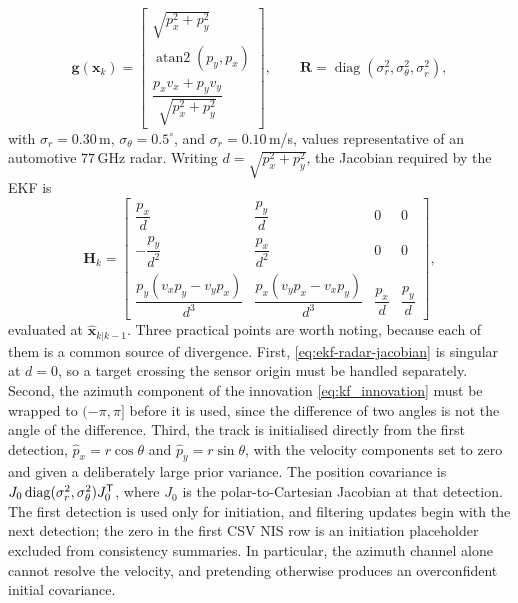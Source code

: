 \begin{example}
\begin{equation}
\mathbf{g}(\mathbf{x}_k)=
\begin{bmatrix}
\sqrt{p_x^{2}+p_y^{2}}\\[4pt]
\operatorname{atan2}(p_y,p_x)\\[4pt]
\dfrac{p_xv_x+p_yv_y}{\sqrt{p_x^{2}+p_y^{2}}}
\end{bmatrix},
\qquad
\mathbf{R}=\operatorname{diag}\!\left(\sigma_r^{2},\sigma_\theta^{2},\sigma_{\dot r}^{2}\right),
\label{eq:ekf-radar-meas}
\end{equation}
with $\sigma_r=0.30$\,m, $\sigma_\theta=0.5^{\circ}$, and
$\sigma_{\dot r}=0.10$\,m/s, values representative of an automotive
$77$\,GHz radar. Writing $d=\sqrt{p_x^{2}+p_y^{2}}$, the Jacobian required by
the EKF is
\begin{equation}
\mathbf{H}_k=
\begin{bmatrix}
\dfrac{p_x}{d} & \dfrac{p_y}{d} & 0 & 0\\[8pt]
-\dfrac{p_y}{d^{2}} & \dfrac{p_x}{d^{2}} & 0 & 0\\[8pt]
\dfrac{p_y(v_xp_y-v_yp_x)}{d^{3}} &
\dfrac{p_x(v_yp_x-v_xp_y)}{d^{3}} &
\dfrac{p_x}{d} & \dfrac{p_y}{d}
\end{bmatrix},
\label{eq:ekf-radar-jacobian}
\end{equation}
evaluated at $\widehat{\mathbf{x}}_{k|k-1}$. Three practical points are worth
noting, because each of them is a common source of divergence. First,
\eqref{eq:ekf-radar-jacobian} is singular at $d=0$, so a target crossing the
sensor origin must be handled separately. Second, the azimuth component of the
innovation \eqref{eq:kf_innovation} must be wrapped to $(-\pi,\pi]$ before it is
used, since the difference of two angles is not the angle of the difference.
Third, the track is initialised directly from the first detection,
$\widehat{p}_x=r\cos\theta$ and $\widehat{p}_y=r\sin\theta$, with the velocity components set to zero and given a deliberately large prior variance. The position covariance is $J_0\operatorname{diag}(\sigma_r^2,\sigma_\theta^2)J_0^{\mathsf T}$, where $J_0$ is the polar-to-Cartesian Jacobian at that detection. The first detection is used only for initiation, and filtering updates begin with the next detection; the zero in the first CSV NIS row is an initiation placeholder excluded from consistency summaries. In particular, the
azimuth channel alone cannot resolve the velocity, and pretending otherwise
produces an overconfident initial covariance.


\end{example}
